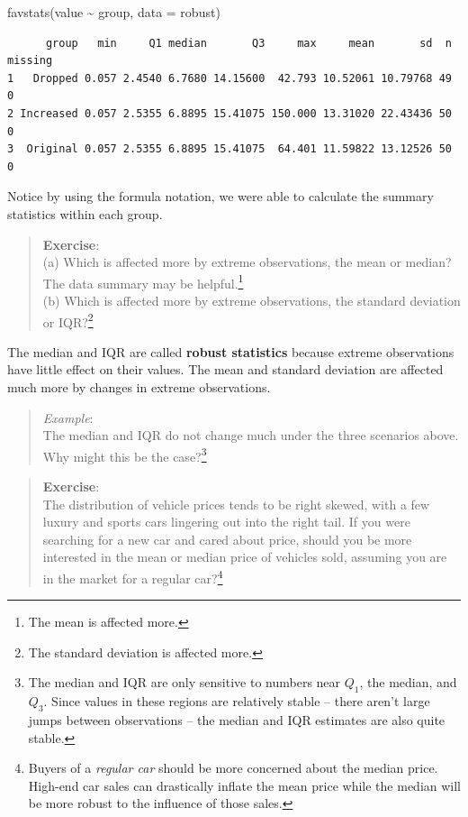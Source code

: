 \documentclass[
  letterpaper,
  DIV=11,
  numbers=noendperiod]{scrreprt}
\newenvironment{Shaded}{\begin{snugshade}}{\end{snugshade}}
\newcommand{\AttributeTok}[1]{\textcolor[rgb]{0.40,0.45,0.13}{#1}}
\newcommand{\FunctionTok}[1]{\textcolor[rgb]{0.28,0.35,0.67}{#1}}
\newcommand{\NormalTok}[1]{\textcolor[rgb]{0.00,0.23,0.31}{#1}}
\newcommand{\SpecialCharTok}[1]{\textcolor[rgb]{0.37,0.37,0.37}{#1}}
\begin{document}
\begin{Shaded}
\begin{Highlighting}[]
\FunctionTok{favstats}\NormalTok{(value }\SpecialCharTok{\textasciitilde{}}\NormalTok{ group, }\AttributeTok{data =}\NormalTok{ robust)}
\end{Highlighting}
\end{Shaded}

\begin{verbatim}
      group   min     Q1 median       Q3     max     mean       sd  n missing
1   Dropped 0.057 2.4540 6.7680 14.15600  42.793 10.52061 10.79768 49       0
2 Increased 0.057 2.5355 6.8895 15.41075 150.000 13.31020 22.43436 50       0
3  Original 0.057 2.5355 6.8895 15.41075  64.401 11.59822 13.12526 50       0
\end{verbatim}

Notice by using the formula notation, we were able to calculate the
summary statistics within each group.

\begin{quote}
\textbf{Exercise}:\\
(a) Which is affected more by extreme observations, the mean or median?
The data summary may be helpful.\footnote{The mean is affected more.}\\
(b) Which is affected more by extreme observations, the standard
deviation or IQR?\footnote{The standard deviation is affected more.}
\end{quote}

The median and IQR are called \textbf{robust statistics} because extreme
observations have little effect on their values. The mean and standard
deviation are affected much more by changes in extreme observations.

\begin{quote}
\emph{Example}:\\
The median and IQR do not change much under the three scenarios above.
Why might this be the case?\footnote{The median and IQR are only
  sensitive to numbers near \(Q_1\), the median, and \(Q_3\). Since
  values in these regions are relatively stable -- there aren't large
  jumps between observations -- the median and IQR estimates are also
  quite stable.}
\end{quote}

\begin{quote}
\textbf{Exercise}:\\
The distribution of vehicle prices tends to be right skewed, with a few
luxury and sports cars lingering out into the right tail. If you were
searching for a new car and cared about price, should you be more
interested in the mean or median price of vehicles sold, assuming you
are in the market for a regular car?\footnote{Buyers of a \emph{regular
  car} should be more concerned about the median price. High-end car
  sales can drastically inflate the mean price while the median will be
  more robust to the influence of those sales.}
\end{quote}
\end{document}
